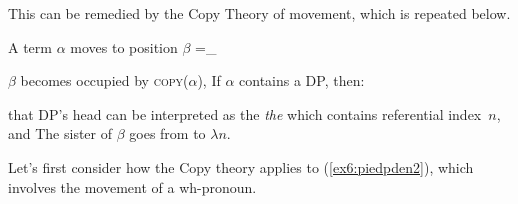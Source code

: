 This can be remedied by the Copy Theory of movement, which is repeated below.
\begin{exe}
	\raggedright
		A term $\alpha$ moves to position $\beta$ =_{}
		\begin{xlist}
			\ex $\beta$ becomes occupied by \textsc{copy}($\alpha$), 
			\ex \label{ex6:tracecon}If $\alpha$ contains a DP, then:
			\begin{xlist}
			\ex that DP's head can be interpreted as the \emph{the} which contains referential index~$n$, and
			\ex The sister of $\beta$ goes from \denotes{$\rho$} to $\lambda n$\denotes{$\rho$}.
			\end{xlist}
		\end{xlist}
	\end{exe}
Let's first consider how the Copy theory applies to (\ref{ex6:piedpden2}), which involves the movement of a wh-pronoun. 

